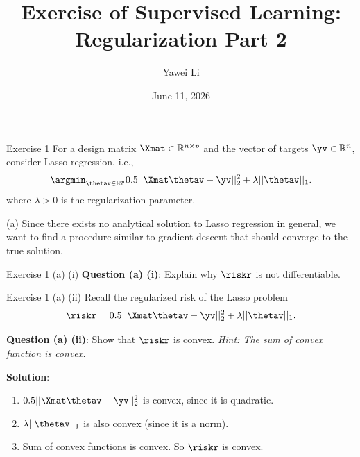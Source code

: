 \documentclass[aspectratio=169]{beamer}
\title[]{\textbf{Exercise of Supervised Learning: \\ Regularization Part 2}}
\author{Yawei Li}
\institute[LMU]
{
\\
  \texttt{yawei.li@stat.uni-muenchen.de}
}
\date{June 11, 2026}
\begin{document}
\begin{frame}
\titlepage

\end{frame}


\begin{frame}{Exercise 1}
	For a design matrix $\Xmat \in \mathbb{R}^{n \times p}$ and the vector of targets $\yv \in \mathbb{R}^n$, consider Lasso regression, i.e., 
	$$\argmin_{\thetav \in \mathbb{R}^p} 0.5 || \Xmat \thetav - \yv ||_2^2 + \lambda ||\thetav||_1.$$
	where $\lambda > 0$ is the regularization parameter.
	
	(a) Since there exists no analytical solution to Lasso regression in general, we want to find a procedure similar to gradient descent that should converge to the true solution.
	
	\vspace{10pt}
\end{frame}

\begin{frame}{Exercise 1 (a) (i)}
	\textbf{Question (a) (i)}: Explain why $\riskr$ is not differentiable.
	
	\vspace{10pt}
\end{frame}

\begin{frame}{Exercise 1 (a) (ii)}
	Recall the regularized risk of the Lasso problem $$\riskr = 0.5 ||\Xmat \thetav - \yv ||_2^2 + \lambda ||\thetav||_1.$$

	\textbf{Question (a) (ii)}: Show that $\riskr$ is convex. \emph{Hint: The sum of convex function is convex.}
	
	\vspace{10pt} 
	
	\textbf{Solution}: 
		\begin{enumerate}
			\item<2-> $0.5 ||\Xmat \thetav - \yv ||_2^2$ is convex, since it is quadratic.
			\item<3-> $\lambda || \thetav ||_1$ is also convex (since it is a norm).
			\item<4-> Sum of convex functions is convex. So $\riskr$ is convex.
		\end{enumerate}
\end{frame}
\end{document}
